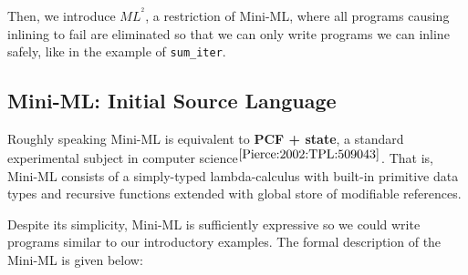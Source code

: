 \documentclass[a4paper,11pt,oneside]{article}
\theoremstyle{plain}
\newcommand{\inlsrc}{\textit{ML}^{^2}}
\begin{document}
	Then, we introduce ${\inlsrc}$, a restriction of Mini-ML, where all programs causing inlining to fail are eliminated so that we can only write programs we can inline safely, like in the example of \texttt{sum\_iter}. 
	
\subsection{Mini-ML: Initial Source Language}

	Roughly speaking Mini-ML is equivalent to \textbf{PCF + state}, a standard experimental subject in computer science{\footnotesize$^{ \cite[p.~143]{Pierce:2002:TPL:509043}}$}. 
	That is, Mini-ML consists of a simply-typed lambda-calculus with built-in primitive data types and recursive functions extended with global store of modifiable references.
	
	Despite its simplicity, Mini-ML is sufficiently expressive so we  
could write programs similar to our introductory examples.
	The formal description of the Mini-ML is given below: 
	
\end{document}
